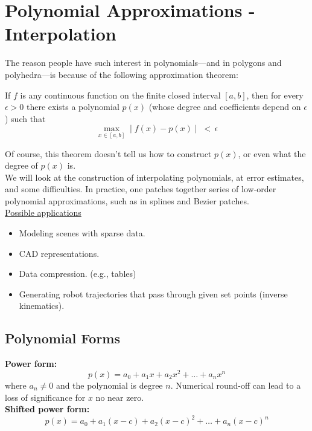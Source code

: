 \chapter{Polynomial Approximations - Interpolation}

The reason people have such interest in polynomials---and in polygons and polyhedra---is because of the following approximation theorem:

\begin{theorem}
If $f$ is any continuous function on the finite closed interval $[a,b]$, then for every $\epsilon>0$ there exists a polynomial $p(x)$ (whose degree and coefficients depend on $\epsilon$) such that 
$$
\max_{x\in [a,b]} \mid f(x) - p(x) \mid \; < \, \epsilon
$$
\end{theorem}

\noindent Of course, this theorem doesn't tell us how to construct $p(x)$, or even what the degree of $p(x)$ is. \\

\noindent We will look at the construction of interpolating polynomials, at error estimates, and some difficulties.
In practice, one patches together series of low-order polynomial approximations, such as in splines and Bezier patches. \\

\noindent \underline{Possible applications}
\begin{itemize}
    \item Modeling scenes with sparse data.
    \item CAD representations.
    \item Data compression. (e.g., tables)
    \item Generating robot trajectories that pass through given set points (inverse kinematics). 
\end{itemize}

\section{Polynomial Forms}

\textbf{Power form:}
$$
p(x) = a_0 + a_1 x + a_2 x^2 + \dots + a_n x^n
$$
where $a_n \neq 0$ and the polynomial is degree $n$. Numerical round-off can lead to a loss of significance for $x$ no near zero. \\

\noindent \textbf{Shifted power form:}
$$
p(x) = a_0 + a_1 (x-c) + a_2 (x-c)^2 + \dots + a_n(x-c)^n
$$


